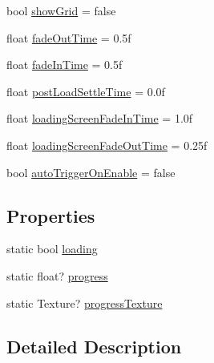 \begin{DoxyCompactItemize}
bool \mbox{\hyperlink{class_valve_1_1_v_r_1_1_steam_v_r___load_level_a45cda28d3ef83a848fb85e1b0fe70acd}{show\+Grid}} = false
\item 
float \mbox{\hyperlink{class_valve_1_1_v_r_1_1_steam_v_r___load_level_a7b1678ec4a9cfe4677f7bb62b4e2605d}{fade\+Out\+Time}} = 0.\+5f
\item 
float \mbox{\hyperlink{class_valve_1_1_v_r_1_1_steam_v_r___load_level_af8a3b1c29f83d0396558840ce132ea84}{fade\+In\+Time}} = 0.\+5f
\item 
float \mbox{\hyperlink{class_valve_1_1_v_r_1_1_steam_v_r___load_level_adb1b07df595fc98133a7a09c16f566ef}{post\+Load\+Settle\+Time}} = 0.\+0f
\item 
float \mbox{\hyperlink{class_valve_1_1_v_r_1_1_steam_v_r___load_level_a1b7a66cdceb72c6d10e7232c21e7ba57}{loading\+Screen\+Fade\+In\+Time}} = 1.\+0f
\item 
float \mbox{\hyperlink{class_valve_1_1_v_r_1_1_steam_v_r___load_level_a204cc6798b089fcef99241dd98732e70}{loading\+Screen\+Fade\+Out\+Time}} = 0.\+25f
\item 
bool \mbox{\hyperlink{class_valve_1_1_v_r_1_1_steam_v_r___load_level_ac2ffd012899c91cf6ad2af73c7f5a0ee}{auto\+Trigger\+On\+Enable}} = false
\end{DoxyCompactItemize}
\subsection*{Properties}
\begin{DoxyCompactItemize}
\item 
static bool \mbox{\hyperlink{class_valve_1_1_v_r_1_1_steam_v_r___load_level_ac26d25e9953dc093823c8b2b17ab8512}{loading}}
\item 
static float? \mbox{\hyperlink{class_valve_1_1_v_r_1_1_steam_v_r___load_level_a29e394161a441efd0b33e516871b475d}{progress}}
\item 
static Texture? \mbox{\hyperlink{class_valve_1_1_v_r_1_1_steam_v_r___load_level_a48a694e49f94051b84dcc127df255397}{progress\+Texture}}
\end{DoxyCompactItemize}


\subsection{Detailed Description}


